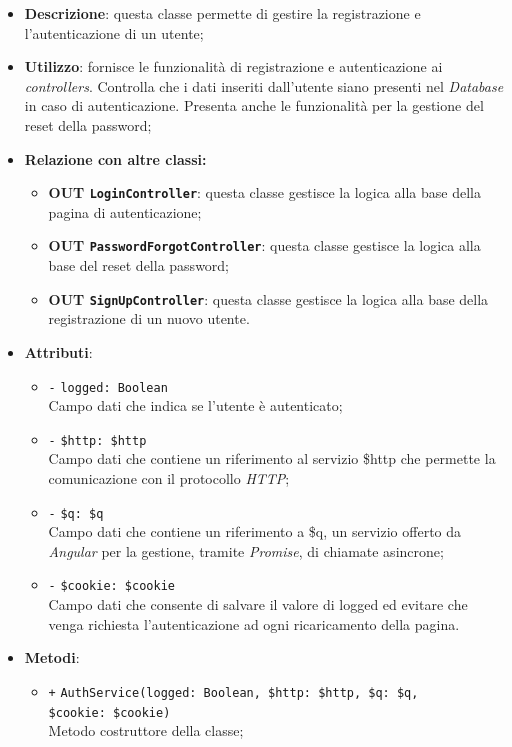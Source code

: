 \begin{itemize}
	\item \textbf{Descrizione}: questa classe permette di gestire la registrazione e l'autenticazione di un utente;
	\item \textbf{Utilizzo}: fornisce le funzionalità di registrazione e autenticazione ai \textit{controllers}. Controlla che i dati inseriti dall'utente siano presenti nel \textit{Database} in caso di autenticazione. Presenta anche le funzionalità per la gestione del reset della password;
	\item \textbf{Relazione con altre classi:}
	\begin{itemize}
		\item \textbf{OUT \texttt{LoginController}}: questa classe gestisce la logica alla base della pagina di autenticazione;
		\item \textbf{OUT \texttt{PasswordForgotController}}: questa classe gestisce la logica alla base del reset della password;
		\item \textbf{OUT \texttt{SignUpController}}: questa classe gestisce la logica alla base della registrazione di un nuovo utente.
	\end{itemize}
	\item \textbf{Attributi}:
	\begin{itemize}
		\item \texttt{-} \texttt{logged: Boolean} \\ Campo dati che indica se l'utente è autenticato;
		\item \texttt{-} \texttt{\$http: \$http} \\ Campo dati che contiene un riferimento al servizio \$http che permette la comunicazione con il protocollo \textit{HTTP};
		\item \texttt{-} \texttt{\$q: \$q} \\ Campo dati che contiene un riferimento a \$q, un servizio offerto da \textit{Angular} per la gestione, tramite \textit{Promise}, di chiamate asincrone;
		\item \texttt{-} \texttt{\$cookie: \$cookie} \\ Campo dati che consente di salvare il valore di logged ed evitare che venga richiesta l'autenticazione ad ogni ricaricamento della pagina.
	\end{itemize}
	\item \textbf{Metodi}:
	\begin{itemize}
		\item \texttt{+} \texttt{AuthService(logged: Boolean, \$http: \$http, \$q: \$q, \\ \$cookie: \$cookie)} \\ Metodo costruttore della classe; \\

\end{itemize}
\end{itemize}
